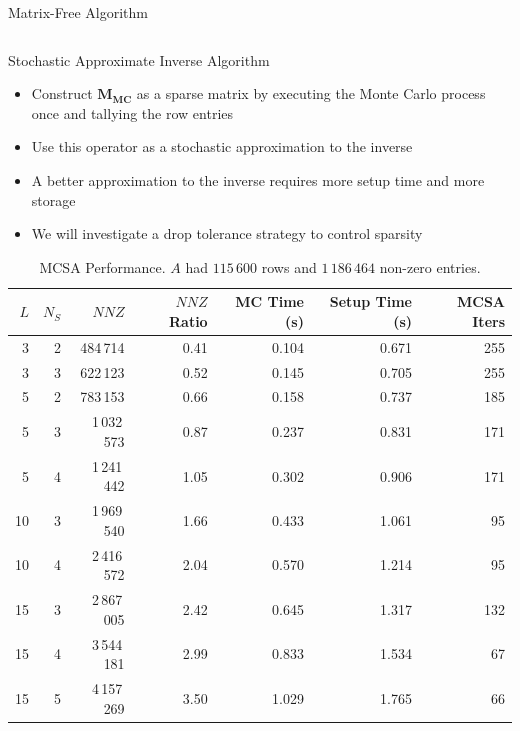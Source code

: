 \documentclass{beamer}
\begin{document}
\begin{frame}{Matrix-Free Algorithm}
\begin{columns}
\begin{column}{0.6\textwidth}
    \end{column}
  \end{columns}
  
\end{frame}

\begin{frame}{Stochastic Approximate Inverse Algorithm}

  \vspace{-0.1in}
  
  \begin{itemize}
    \small
    \item Construct $\mathbf{M_{MC}}$ as a sparse matrix by executing the
      Monte Carlo process once and tallying the row entries
    \item Use this operator as a stochastic approximation to the inverse
    \item A better approximation to the inverse requires more setup time and
      more storage
    \item We will investigate a drop tolerance strategy to control sparsity
  \end{itemize}

  \vspace{-0.1in}

  \begin{table}[htb!]
    \tiny
    \begin{center}
      \begin{tabular}{rrrrrrr}
        \toprule
        \multicolumn{1}{r}{$L$} &
        \multicolumn{1}{r}{$N_S$} &
        \multicolumn{1}{r}{$NNZ$} &
        \multicolumn{1}{r}{$NNZ$ Ratio} &
        \multicolumn{1}{r}{MC Time (s)} &
        \multicolumn{1}{r}{Setup Time (s)} &
        \multicolumn{1}{r}{MCSA Iters}
        \\ \midrule
        3 & 2 & 484\,714 & 0.41 & 0.104 & 0.671 & 255 \\
        3 & 3 & 622\,123 & 0.52 & 0.145 & 0.705 & 255 \\
        5 & 2 & 783\,153 & 0.66 & 0.158 & 0.737 & 185 \\
        5 & 3 & 1\,032\,573 & 0.87 & 0.237 & 0.831 & 171 \\
        5 & 4 & 1\,241\,442 & 1.05 & 0.302 & 0.906 & 171 \\
        10 & 3 & 1\,969\,540 & 1.66 & 0.433 & 1.061 & 95 \\
        10 & 4 & 2\,416\,572 & 2.04 & 0.570 & 1.214 & 95 \\
        15 & 3 & 2\,867\,005 & 2.42 & 0.645 & 1.317 & 132 \\
        15 & 4 & 3\,544\,181 & 2.99 & 0.833 & 1.534 & 67 \\
        15 & 5 & 4\,157\,269 & 3.50 & 1.029 & 1.765 & 66 \\
        \bottomrule
      \end{tabular}
    \end{center}
    \caption{MCSA Performance. $A$ had $115\,600$ rows and $1\,186\,464$
      non-zero entries.}
  \end{table} 


\end{frame}
\end{document}
